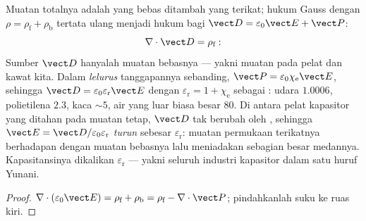 \begin{proposition}\label{prop:b3:electromagnetism-in-matter:displacement}
Muatan totalnya adalah yang bebas ditambah yang terikat; hukum Gauss dengan $\rho =
\rho_{\text{f}} + \rho_{\text{b}}$ tertata ulang menjadi hukum bagi
\emph{} $\vect D = \varepsilon_0\vect E +
\vect P$:
\[
\nabla\cdot\vect D = \rho_{\text{f}} :
\]
Sumber $\vect D$ hanyalah muatan bebasnya --- yakni muatan pada
pelat dan kawat kita. Dalam  \emph{lelurus} tanggapannya
sebanding, $\vect P = \varepsilon_0\chi_{\text{e}}\vect E$, sehingga
$\vect D = \varepsilon_0\varepsilon_{\text{r}}\vect E$ dengan
$\varepsilon_{\text{r}} = 1 + \chi_{\text{e}}$ sebagai \emph{}: udara $1.0006$, polietilena $2.3$, kaca $\sim 5$,
air yang luar biasa besar $80$. Di antara pelat kapasitor yang ditahan pada
muatan tetap, $\vect D$ tak berubah oleh , sehingga $\vect E =
\vect D/\varepsilon_0\varepsilon_{\text{r}}$ \emph{turun} sebesar
$\varepsilon_{\text{r}}$: muatan permukaan terikatnya berhadapan dengan
muatan bebasnya lalu meniadakan sebagian besar medannya. Kapasitansinya
dikalikan
$\varepsilon_{\text{r}}$ --- yakni seluruh industri kapasitor dalam satu
huruf Yunani.
\end{proposition}

\begin{proof}
$\nabla\cdot(\varepsilon_0\vect E) = \rho_{\text{f}} +
\rho_{\text{b}} = \rho_{\text{f}} - \nabla\cdot\vect P$; pindahkanlah
suku  ke ruas kiri.
\end{proof}

